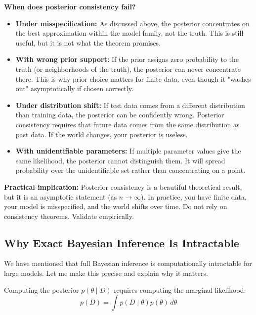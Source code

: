 \textbf{When does posterior consistency fail?}

\begin{itemize}
\item \textbf{Under misspecification:} As discussed above, the posterior concentrates on the best approximation within the model family, not the truth. This is still useful, but it is not what the theorem promises.

\item \textbf{With wrong prior support:} If the prior assigns zero probability to the truth (or neighborhoods of the truth), the posterior can never concentrate there. This is why prior choice matters for finite data, even though it "washes out" asymptotically if chosen correctly.

\item \textbf{Under distribution shift:} If test data comes from a different distribution than training data, the posterior can be confidently wrong. Posterior consistency requires that future data comes from the same distribution as past data. If the world changes, your posterior is useless.

\item \textbf{With unidentifiable parameters:} If multiple parameter values give the same likelihood, the posterior cannot distinguish them. It will spread probability over the unidentifiable set rather than concentrating on a point.
\end{itemize}

\textbf{Practical implication:} Posterior consistency is a beautiful theoretical result, but it is an asymptotic statement (as $n \to \infty$). In practice, you have finite data, your model is misspecified, and the world shifts over time. Do not rely on consistency theorems. Validate empirically.

\subsection{Why Exact Bayesian Inference Is Intractable}

We have mentioned that full Bayesian inference is computationally intractable for large models. Let me make this precise and explain why it matters.

Computing the posterior $p(\theta \mid D)$ requires computing the marginal likelihood:
\begin{equation}
p(D) = \int p(D \mid \theta) p(\theta) \, d\theta
\end{equation}

